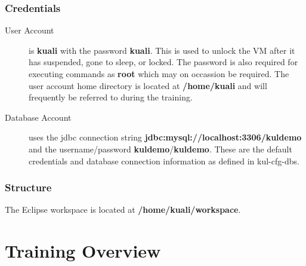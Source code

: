 \documentclass[letterpaper,notitlepage,12pt]{book}
\begin{document}
\subsubsection*{Credentials}
\begin{description}
\item [User Account] is \textbf{kuali} with the password
  \textbf{kuali}. This is used to unlock the VM after it has suspended,
  gone to sleep, or locked. The password is also required for
  executing commands as \textbf{root} which may on occassion be
  required. The user account home directory is located at
  \textbf{/home/kuali} and will frequently be referred to during the training.
\item [Database Account] uses the jdbc connection string
  \textbf{jdbc:mysql://localhost:3306/kuldemo} and the
  username/password \textbf{kuldemo}/\textbf{kuldemo}. These are the
  default credentials and database connection information as defined
  in kul-cfg-dbs.
\end{description}

\subsubsection*{Structure}
The Eclipse workspace is located at \textbf{/home/kuali/workspace}. 


\section*{Training Overview}




\end{document}
